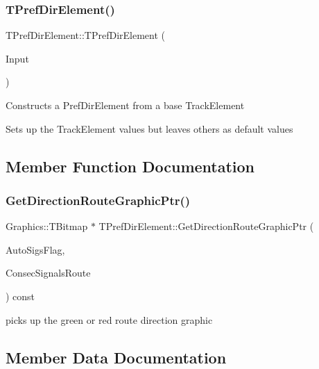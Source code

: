 \subsubsection{\texorpdfstring{T\+Pref\+Dir\+Element()}{TPrefDirElement()}}
{\footnotesize\ttfamily T\+Pref\+Dir\+Element\+::\+T\+Pref\+Dir\+Element (\begin{DoxyParamCaption}\item[{\mbox{\hyperlink{class_t_track_element}{T\+Track\+Element}}}]{Input }\end{DoxyParamCaption})\hspace{0.3cm}{\ttfamily [inline]}}

Constructs a Pref\+Dir\+Element from a base Track\+Element

Sets up the Track\+Element values but leaves others as default values 

\subsection{Member Function Documentation}
\mbox{\label{class_t_pref_dir_element_a5d03028241e6c38e473882120d5bcc68}} 
\subsubsection{\texorpdfstring{Get\+Direction\+Route\+Graphic\+Ptr()}{GetDirectionRouteGraphicPtr()}}
{\footnotesize\ttfamily Graphics\+::\+T\+Bitmap $\ast$ T\+Pref\+Dir\+Element\+::\+Get\+Direction\+Route\+Graphic\+Ptr (\begin{DoxyParamCaption}\item[{bool}]{Auto\+Sigs\+Flag,  }\item[{bool}]{Consec\+Signals\+Route }\end{DoxyParamCaption}) const\hspace{0.3cm}{\ttfamily [protected]}}

picks up the green or red route direction graphic 

\subsection{Member Data Documentation}
\mbox{\label{class_t_pref_dir_element_a523e6fa892a5a25bda21436c23de6732}} 
